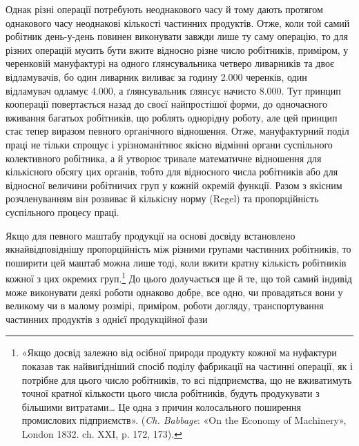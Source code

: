 Однак різні операції потребують неоднакового часу й тому
дають протягом однакового часу неоднакові кількості частинних
продуктів. Отже, коли той самий робітник день-у-день повинен
виконувати завжди лише ту саму операцію, то для різних
операцій мусить бути вжите відносно різне число робітників,
приміром, у черенковій мануфактурі на одного ґлянсувальника
четверо ливарників та двоє відламувачів, бо один ливарник виливає
за годину 2.000 черенків, один відламувач одламує 4.000, а
ґлянсувальник ґлянсує начисто 8.000. Тут принцип кооперації
повертається назад до своєї найпростішої форми, до одночасного
вживання багатьох робітників, що роблять однорідну роботу,
але цей принцип стає тепер виразом певного органічного відношення.
Отже, мануфактурний поділ праці не тільки спрощує
і урізноманітнює якісно відмінні органи суспільного колективного
робітника, а й утворює тривале математичне відношення
для кількісного обсягу цих органів, тобто для відносного числа
робітників або для відносної величини робітничих груп у кожній
окремій функції. Разом з якісним розчленуванням він розвиває
й кількісну норму (Regel) та пропорційність суспільного процесу
праці.

Якщо для певного маштабу продукції на основі досвіду встановлено
якнайвідповіднішу пропорційність між різними групами
частинних робітників, то поширити цей маштаб можна лише тоді,
коли вжити кратну кількість робітників кожної з цих окремих
груп.\footnote{
«Якщо досвід залежно від осібної природи продукту кожної ма
нуфактури показав так найвигідніший спосіб поділу фабрикації на
частинні операції, як і потрібне для цього число робітників, то всі підприємства,
що не вживатимуть точної кратної кількости цього числа
робітників, будуть продукувати з більшими витратами\dots{} Це одна з
причин колосального поширення промислових підприємств». (\emph{Ch. Babbage}:
«On the Economy of Machinery», London 1832. ch. XXI, p. 172, 173).
} До цього долучається ще й те, що той самий індивід може
виконувати деякі роботи однаково добре, все одно, чи провадяться
вони у великому чи в малому розмірі, приміром, роботи догляду,
транспортування частинних продуктів з однієї продукційної фази
\parbreak{}  %
